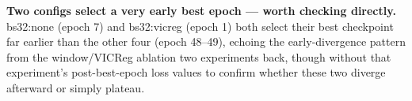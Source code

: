 \textbf{Two configs select a very early best epoch --- worth checking directly.}
bs32:none (epoch 7) and bs32:vicreg (epoch 1) both select their best checkpoint far
earlier than the other four (epoch 48--49), echoing the early-divergence pattern from
the window/VICReg ablation two experiments back, though without that experiment's
post-best-epoch loss values to confirm whether these two diverge afterward or simply
plateau.
